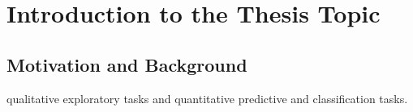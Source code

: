 
\chapter{Introduction to the Thesis Topic} %

\label{Chapter1} %


\newcommand{\keyword}[1]{\textbf{#1}}
\newcommand{\tabhead}[1]{\textbf{#1}}
\newcommand{\code}[1]{\texttt{#1}}
\newcommand{\file}[1]{\texttt{\bfseries#1}}
\newcommand{\option}[1]{\texttt{\itshape#1}}

\section{Motivation and Background}






qualitative exploratory tasks and quantitative predictive and classification tasks.



